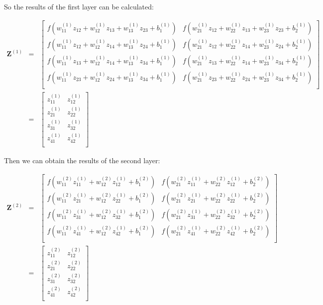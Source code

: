 \documentclass{article}
\begin{document}
\noindent So the results of the first layer can be calculated:

\begin{eqnarray}
\mathbf{Z}^{(1)} 
& = & \left[\begin{array}{ccc}
	f(w^{(1)}_{11}z_{12} + w^{(1)}_{12}z_{13} + w^{(1)}_{13}z_{23} + b^{(1)}_1) &
	f(w^{(1)}_{21}z_{12} + w^{(1)}_{22}z_{13} + w^{(1)}_{23}z_{23} + b^{(1)}_2) \\
	f(w^{(1)}_{11}z_{12} + w^{(1)}_{12}z_{14} + w^{(1)}_{13}z_{24} + b^{(1)}_1) &
	f(w^{(1)}_{21}z_{12} + w^{(1)}_{22}z_{14} + w^{(1)}_{23}z_{24} + b^{(1)}_2) \\
	f(w^{(1)}_{11}z_{13} + w^{(1)}_{12}z_{14} + w^{(1)}_{13}z_{34} + b^{(1)}_1) &
	f(w^{(1)}_{21}z_{13} + w^{(1)}_{22}z_{14} + w^{(1)}_{23}z_{34} + b^{(1)}_2) \\
	f(w^{(1)}_{11}z_{23} + w^{(1)}_{12}z_{24} + w^{(1)}_{13}z_{34} + b^{(1)}_1) &
	f(w^{(1)}_{21}z_{23} + w^{(1)}_{22}z_{24} + w^{(1)}_{23}z_{34} + b^{(1)}_2) \\
\end{array}
\right] \nonumber \\
& = & \left[\begin{array}{ccc}	
	z^{(1)}_{11} & z^{(1)}_{12} \\
	z^{(1)}_{21} & z^{(1)}_{22} \\
	z^{(1)}_{31} & z^{(1)}_{32} \\
	z^{(1)}_{41} & z^{(1)}_{42} \\
\end{array}
\right]
\end{eqnarray}

\noindent Then we can obtain the results of the second layer:

\begin{eqnarray}
\mathbf{Z}^{(2)} 
& = & \left[\begin{array}{ccc}
	f(w^{(2)}_{11}z^{(1)}_{11} + w^{(2)}_{12}z^{(1)}_{12} + b^{(2)}_1) &
	f(w^{(2)}_{21}z^{(1)}_{11} + w^{(2)}_{22}z^{(1)}_{12} + b^{(2)}_2) \\
	f(w^{(2)}_{11}z^{(1)}_{21} + w^{(2)}_{12}z^{(1)}_{22} + b^{(2)}_1) &
	f(w^{(2)}_{21}z^{(1)}_{21} + w^{(2)}_{22}z^{(1)}_{22} + b^{(2)}_2) \\
	f(w^{(2)}_{11}z^{(1)}_{31} + w^{(2)}_{12}z^{(1)}_{32} + b^{(2)}_1) &
	f(w^{(2)}_{21}z^{(1)}_{31} + w^{(2)}_{22}z^{(1)}_{32} + b^{(2)}_2) \\
	f(w^{(2)}_{11}z^{(1)}_{41} + w^{(2)}_{12}z^{(1)}_{42} + b^{(2)}_1) &
	f(w^{(2)}_{21}z^{(1)}_{41} + w^{(2)}_{22}z^{(1)}_{42} + b^{(2)}_2) \\
\end{array}
\right] \nonumber \\
& = & \left[\begin{array}{ccc}	
	z^{(2)}_{11} & z^{(2)}_{12} \\
	z^{(2)}_{21} & z^{(2)}_{22} \\
	z^{(2)}_{31} & z^{(2)}_{32} \\
	z^{(2)}_{41} & z^{(2)}_{42} \\
\end{array}
\right]
\end{eqnarray}
\end{document}
